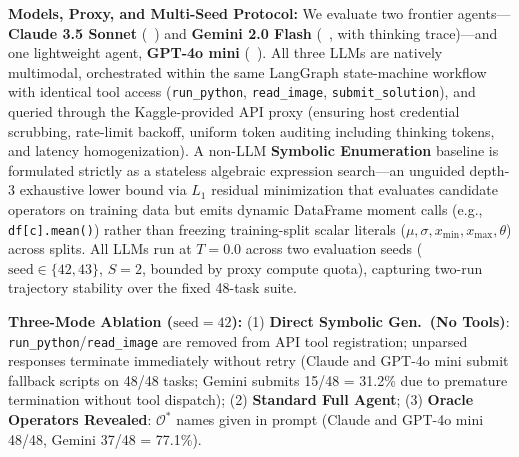 \documentclass[sigconf]{acmart}
\begin{document}
\noindent\textbf{Models, Proxy, and Multi-Seed Protocol:} We evaluate two frontier agents—\textbf{Claude 3.5 Sonnet} (~\cite{anthropic2024claude35}) and \textbf{Gemini 2.0 Flash} (~\cite{geminiteam2025gemini}, with thinking trace)—and one lightweight agent, \textbf{GPT-4o mini} (~\cite{openai2024gpt4o}). All three LLMs are natively multimodal, orchestrated within the same LangGraph state-machine workflow~\cite{langgraph2024} with identical tool access (\texttt{run\_python}, \texttt{read\_image}, \texttt{submit\_solution}), and queried through the Kaggle-provided API proxy (ensuring host credential scrubbing, rate-limit backoff, uniform token auditing including thinking tokens, and latency homogenization). A non-LLM \textbf{Symbolic Enumeration} baseline is formulated strictly as a stateless algebraic expression search—an unguided depth-3 exhaustive lower bound via $L_1$ residual minimization that evaluates candidate operators on training data but emits dynamic DataFrame moment calls (e.g., \texttt{df[c].mean()}) rather than freezing training-split scalar literals ($\mu,\sigma,x_{\min},x_{\max},\theta$) across splits. All LLMs run at $T=0.0$ across two evaluation seeds ($\text{seed}\in\{42,43\}$, $S=2$, bounded by proxy compute quota), capturing two-run trajectory stability over the fixed 48-task suite.

\noindent\textbf{Three-Mode Ablation ($\text{seed}=42$):} (1) \textbf{Direct Symbolic Gen.\ (No Tools)}: \texttt{run\_python}/\texttt{read\_image} are removed from API tool registration; unparsed responses terminate immediately without retry (Claude and GPT-4o mini submit fallback scripts on 48/48 tasks; Gemini submits 15/48 = 31.2\% due to premature termination without tool dispatch); (2) \textbf{Standard Full Agent}; (3) \textbf{Oracle Operators Revealed}: $\mathcal{O}^*$ names given in prompt (Claude and GPT-4o mini 48/48, Gemini 37/48 = 77.1\%).
\end{document}
